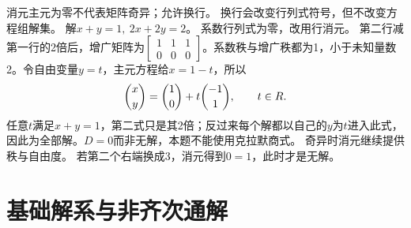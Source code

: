 {消元主元为零不代表矩阵奇异；允许换行。}
{换行会改变行列式符号，但不改变方程组解集。}
{解$x+y=1,\ 2x+2y=2$。}
{系数行列式为零，改用行消元。}
{第二行减第一行的2倍后，增广矩阵为$\left[\begin{array}{cc|c}1&1&1\\0&0&0\end{array}\right]$。系数秩与增广秩都为1，小于未知量数2。令自由变量$y=t$，主元方程给$x=1-t$，所以
\[\binom xy=\binom10+t\binom{-1}{1},\qquad t\in R.\]
任意$t$满足$x+y=1$，第二式只是其2倍；反过来每个解都以自己的$y$为$t$进入此式，因此为全部解。$D=0$而非无解，本题不能使用克拉默商式。}
{奇异时消元继续提供秩与自由度。}
{若第二个右端换成3，消元得到$0=1$，此时才是无解。}


\section{基础解系与非齐次通解}
